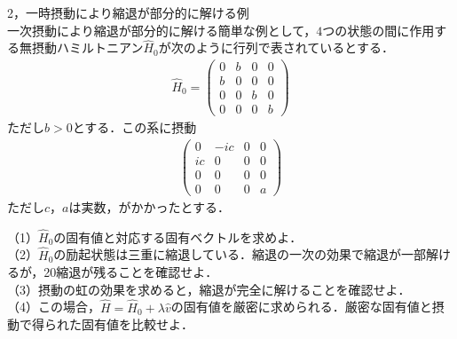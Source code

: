 \documentclass[a4j]{jarticle}
\begin{document}
2，一時摂動により縮退が部分的に解ける例\\
一次摂動により縮退が部分的に解ける簡単な例として，$4$つの状態の間に作用する無摂動ハミルトニアン$\hat{H}_0$が次のように行列で表されているとする．
\begin{align*}
 \hat{H}_0=
 \begin{pmatrix}
  0&b&0&0\\
  b&0 &0 &0 \\
  0&0 &b &0 \\
  0&0 &0 &b 
 \end{pmatrix}
\end{align*}
ただし$b>0$とする．この系に摂動
\begin{align*}
 \begin{pmatrix}
  0&-ic&0&0\\
  ic&0 &0 &0 \\
  0&0 &0 &0 \\
  0&0 &0 &a 
 \end{pmatrix}
\end{align*}
ただし$c$，$a$は実数，がかかったとする．

（1）$\hat{H}_0$の固有値と対応する固有ベクトルを求めよ．\\
（2）$\hat{H}_0$の励起状態は三重に縮退している．縮退の一次の効果で縮退が一部解けるが，20縮退が残ることを確認せよ．\\
（3）摂動の虹の効果を求めると，縮退が完全に解けることを確認せよ．\\
（4）この場合，$\hat{H}=\hat{H}_0+\lambda \hat{v}$の固有値を厳密に求められる．厳密な固有値と摂動で得られた固有値を比較せよ．\\
\end{document}
